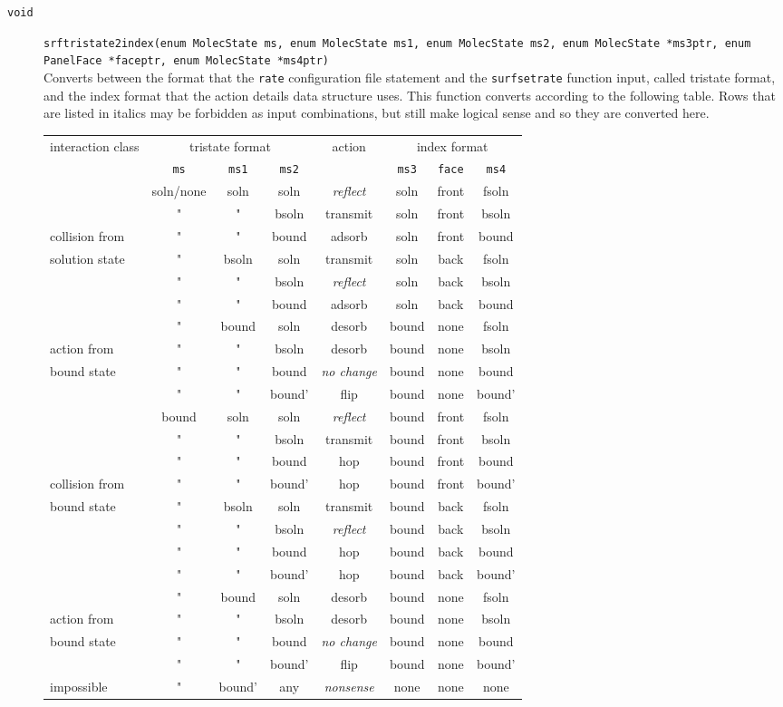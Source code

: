 \documentclass {scrbook}
\newcommand {\ttt} {\texttt}
\begin{document}
\begin{description}
\item[\ttt{void}]
\ttt{srftristate2index(enum MolecState ms, enum MolecState ms1, enum MolecState ms2, enum MolecState *ms3ptr, enum PanelFace *faceptr, enum MolecState *ms4ptr)}
\hfill \\
Converts between the format that the \ttt{rate} configuration file statement and the \ttt{surfsetrate} function input, called tristate format, and the index format that the action details data structure uses. This function converts according to the following table. Rows that are listed in italics may be forbidden as input combinations, but still make logical sense and so they are converted here.

\begin{longtable}[c]{l|ccc|c|ccc}
interaction class&\multicolumn{3}{c}{tristate format}&action&\multicolumn{3}{c}{index format}\\
&\ttt{ms}&\ttt{ms1}&\ttt{ms2}&&\ttt{ms3}&\ttt{face}&\ttt{ms4}\\
\hline
&soln/none&soln&soln&\emph{reflect}&soln&front&fsoln\\
&"&"&bsoln&transmit&soln&front&bsoln\\
collision from&"&"&bound&adsorb&soln&front&bound\\
solution state&"&bsoln&soln&transmit&soln&back&fsoln\\
&"&"&bsoln&\emph{reflect}&soln&back&bsoln\\
&"&"&bound&adsorb&soln&back&bound\\
\hline
&"&bound&soln&desorb&bound&none&fsoln\\
action from&"&"&bsoln&desorb&bound&none&bsoln\\
bound state&"&"&bound&\emph{no change}&bound&none&bound\\
&"&"&bound'&flip&bound&none&bound'\\
\hline
&bound&soln&soln&\emph{reflect}&bound&front&fsoln\\
&"&"&bsoln&transmit&bound&front&bsoln\\
&"&"&bound&hop&bound&front&bound\\
collision from&"&"&bound'&hop&bound&front&bound'\\
bound state&"&bsoln&soln&transmit&bound&back&fsoln\\
&"&"&bsoln&\emph{reflect}&bound&back&bsoln\\
&"&"&bound&hop&bound&back&bound\\
&"&"&bound'&hop&bound&back&bound'\\
\hline
&"&bound&soln&desorb&bound&none&fsoln\\
action from&"&"&bsoln&desorb&bound&none&bsoln\\
bound state&"&"&bound&\emph{no change}&bound&none&bound\\
&"&"&bound'&flip&bound&none&bound'\\
\hline
impossible&"&bound'&any&\emph{nonsense}&none&none&none\\
\end{longtable}


\end{description}
\end{document}
